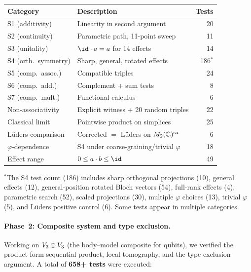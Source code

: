 \begin{center}
\begin{tabular}{@{}llr@{}}
\toprule
Category & Description & Tests \\
\midrule
S1 (additivity)      & Linearity in second argument       & 20 \\
S2 (continuity)      & Parametric path, 11-point sweep     & 11 \\
S3 (unitality)       & $\sp{\id}{a} = a$ for 14 effects    & 14 \\
S4 (orth.\ symmetry) & Sharp, general, rotated effects     & 186$^{*}$ \\
S5 (comp.\ assoc.)   & Compatible triples                  & 24 \\
S6 (comp.\ add.)     & Complement + sum tests              & 8 \\
S7 (comp.\ mult.)    & Functional calculus                  & 6 \\
Non-associativity    & Explicit witness + 20 random triples & 22 \\
Classical limit      & Pointwise product on simplices       & 25 \\
L\"uders comparison  & Corrected $=$ L\"uders on $M_{2}(\mathbb{C})^{\mathrm{sa}}$ & 6 \\
$\varphi$-dependence & S4 under coarse-graining/trivial $\varphi$ & 18 \\
Effect range         & $0 \leq \sp{a}{b} \leq \id$         & 49 \\
\bottomrule
\end{tabular}
\end{center}

\noindent ${}^{*}$The S4 test count (186) includes sharp orthogonal
projections (10), general effects (12), general-position rotated Bloch
vectors (54), full-rank effects (4), parametric search (52), scaled
projections (30), multiple $\varphi$ choices (13), trivial $\varphi$
(5), and L\"uders positive control (6).  Some tests appear in multiple
categories.

\paragraph{Phase~2: Composite system and type exclusion.}
Working on $V_{3} \otimes V_{3}$ (the body--model
composite for qubits), we verified the product-form sequential
product, local tomography, and the type exclusion argument.
A total of \textbf{658+ tests} were executed:

